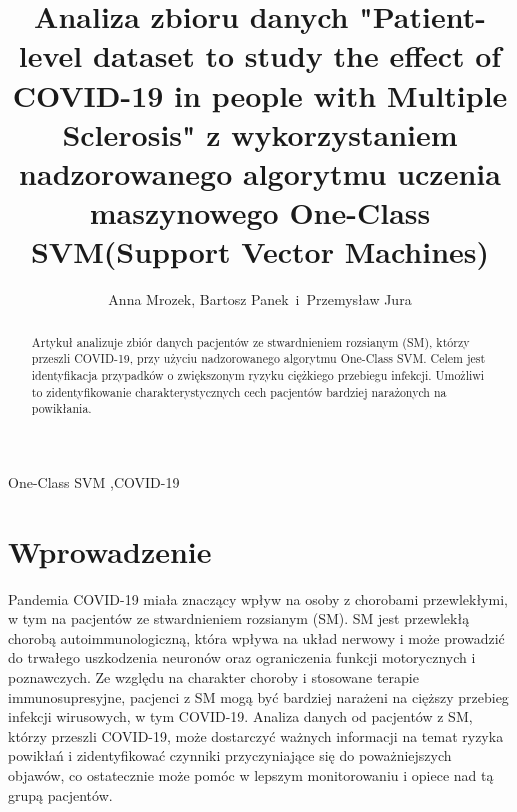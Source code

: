 \documentclass[a4paper,fleqn]{cas-dc}
\begin{document}
\let\WriteBookmarks\relax
\def\floatpagepagefraction{1}
\def\textpagefraction{.001}


\shortauthors{}

\title [mode = title]{Analiza zbioru danych "Patient-level dataset to study the effect of COVID-19 in people with Multiple Sclerosis" z wykorzystaniem nadzorowanego algorytmu uczenia maszynowego One-Class SVM(Support Vector Machines)}                      

\author{Anna Mrozek, Bartosz Panek \,i\, Przemysław Jura  }

\renewcommand{\abstractname}{STRESZCZENIE}
\begin{abstract}
Artykuł analizuje zbiór danych pacjentów ze stwardnieniem rozsianym (SM), którzy przeszli COVID-19, przy użyciu nadzorowanego algorytmu One-Class SVM. Celem jest identyfikacja przypadków o zwiększonym ryzyku ciężkiego przebiegu infekcji. Umożliwi to zidentyfikowanie charakterystycznych cech pacjentów bardziej narażonych na powikłania.
\end{abstract}

\renewcommand{\abstractname}{STRESZCZENIE}
\begin{keywords}
One-Class SVM \sep COVID-19 
\end{keywords}

\maketitle

\section{Wprowadzenie}
Pandemia COVID-19 miała znaczący wpływ na osoby z chorobami przewlekłymi, w tym na pacjentów ze stwardnieniem rozsianym (SM). SM jest przewlekłą chorobą autoimmunologiczną, która wpływa na układ nerwowy i może prowadzić do trwałego uszkodzenia neuronów oraz ograniczenia funkcji motorycznych i poznawczych. Ze względu na charakter choroby i stosowane terapie immunosupresyjne, pacjenci z SM mogą być bardziej narażeni na cięższy przebieg infekcji wirusowych, w tym COVID-19. Analiza danych od pacjentów z SM, którzy przeszli COVID-19, może dostarczyć ważnych informacji na temat ryzyka powikłań i zidentyfikować czynniki przyczyniające się do poważniejszych objawów, co ostatecznie może pomóc w lepszym monitorowaniu i opiece nad tą grupą pacjentów.
\end{document}
